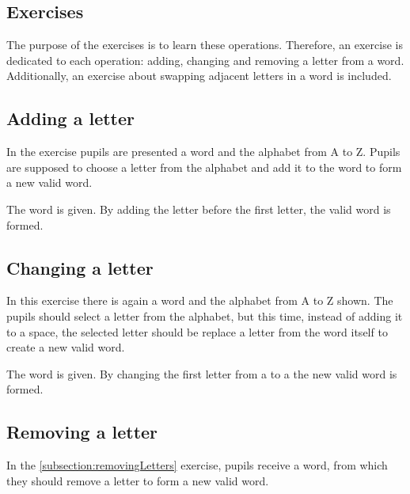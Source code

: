 \subsection{Exercises}

The purpose of the  exercises is to learn these operations. Therefore, an exercise is dedicated to each operation: adding, changing and removing a letter from a word. Additionally, an exercise about swapping adjacent letters in a word is included.

\subsection*{Adding a letter}
\label{subsection:addingLetter}

In the  exercise pupils are presented a word and the alphabet from A to Z. Pupils are supposed to choose a letter from the alphabet and add it to the word to form a new valid word.

\begin{example}
    The word  is given. By adding the letter  before the first letter, the valid word  is formed.
\end{example}

\subsection*{Changing a letter}
\label{subsection:changingLetter}

In this exercise there is again a word and the alphabet from A to Z shown. The pupils should select a letter from the alphabet, but this time, instead of adding it to a space, the selected letter should be replace a letter from the word itself to create a new valid word.

\begin{example}
    The word  is given. By changing the first letter from a  to a  the new valid word  is formed.
\end{example}

\subsection*{Removing a letter}
\label{subsection:removingLetters}

In the \ref{subsection:removingLetters} exercise, pupils receive a word, from which they should remove a letter to form a new valid word.

